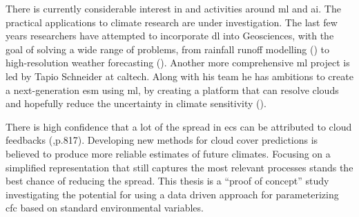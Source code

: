 There is currently considerable interest in and activities around \acrfull{ml} and \acrshort{ai}. The practical applications to climate research are under investigation. The last few years researchers have attempted to incorporate \acrshort{dl} into Geosciences, with the goal of solving a wide range of problems, from rainfall runoff modelling (\cite{hess-23-5089-2019}) to  high-resolution weather forecasting (\cite{Rodrigues2018DeepDownscale:Forecast}). Another more comprehensive \acrshort{ml} project is led by Tapio Schneider at \acrfull{caltech}. Along with his team he has ambitions to create a next-generation \acrfull{esm} using \acrshort{ml}, by creating a platform that can resolve clouds and hopefully reduce the uncertainty in climate sensitivity (\cite{Voosen2018ScienceIntelligence}).

There is high confidence that a lot of the spread in \acrshort{ecs} can be attributed to cloud feedbacks (\cite{IPCC_CH9_climate_models},p.817). Developing new methods for cloud cover predictions is believed to produce more reliable estimates of future climates. Focusing on a simplified representation that still captures the most relevant processes stands the best chance of reducing the spread. This thesis is a ``proof of concept'' study investigating the potential for using a data driven approach for parameterizing \acrfull{cfc} based on standard environmental variables. 


